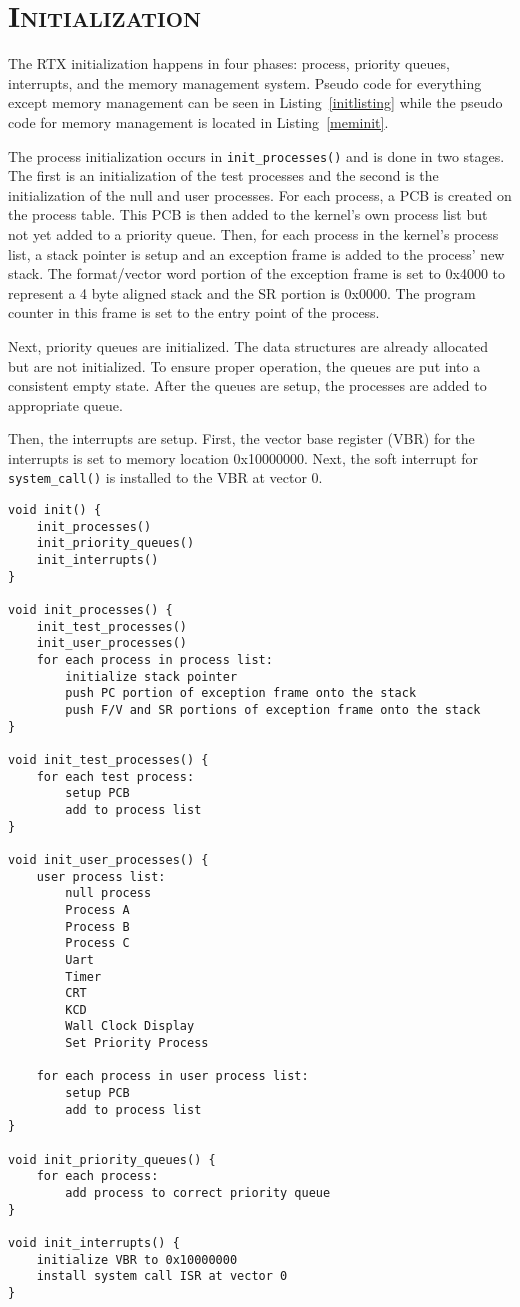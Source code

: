 \documentclass[oneside]{report}
\begin{document}
\section{\textsc{Initialization}}
\label{sec:rtx_init}
The RTX initialization happens in four phases: process, priority queues, 
interrupts, and the memory management system. Pseudo code for everything except 
memory management can be seen in Listing~\ref{initlisting} while the pseudo code 
for memory management is located in Listing~\ref{meminit}.

The process initialization occurs in \texttt{init\_processes()} and is done in 
two stages. The first is an initialization of the test processes and the second 
is the initialization of the null and user processes. For each process, a PCB is 
created on the process table. This PCB is then added to the kernel's own process 
list but not yet added to a priority queue. Then, for each process in the 
kernel's process list, a stack pointer is setup and an exception frame is added 
to the process' new stack. The format/vector word portion of the exception frame 
is set to 0x4000 to represent a 4 byte aligned stack and the SR portion is 
0x0000. The program counter in this frame is set to the entry point of 
the process.

Next, priority queues are initialized. The data structures are already
allocated but are not initialized. To ensure proper operation, the queues are
put into a consistent empty state. After the queues are setup, the processes
are added to appropriate queue.

Then, the interrupts are setup. First, the vector base register (VBR) for the
interrupts is set to memory location 0x10000000. Next, the soft interrupt for
\texttt{system\_call()} is installed to the VBR at vector 0.

\begin{lstlisting}
void init() {
    init_processes()
    init_priority_queues()
    init_interrupts()
}

void init_processes() {
    init_test_processes()
    init_user_processes()
    for each process in process list:
        initialize stack pointer
        push PC portion of exception frame onto the stack
        push F/V and SR portions of exception frame onto the stack
}

void init_test_processes() {
    for each test process: 
        setup PCB
        add to process list
}

void init_user_processes() {
    user process list:
        null process
        Process A
        Process B
        Process C
        Uart
        Timer
        CRT
        KCD
        Wall Clock Display
        Set Priority Process

    for each process in user process list:
        setup PCB
        add to process list
}

void init_priority_queues() {
    for each process: 
        add process to correct priority queue
}

void init_interrupts() {
    initialize VBR to 0x10000000
    install system call ISR at vector 0
}
\end{lstlisting}
\end{document}
